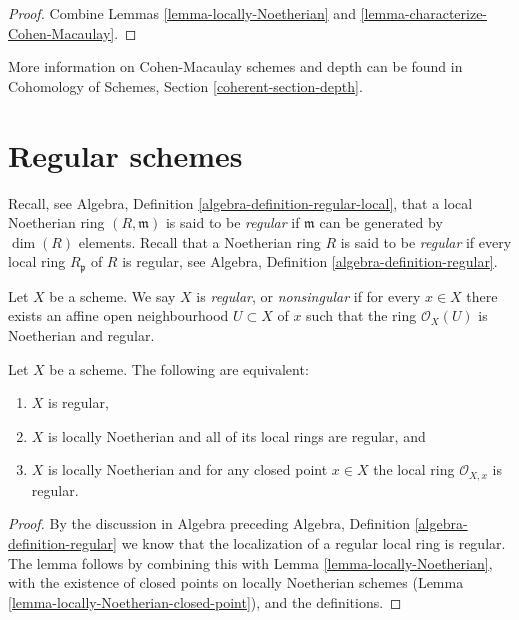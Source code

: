\begin{proof}
Combine Lemmas \ref{lemma-locally-Noetherian}
and \ref{lemma-characterize-Cohen-Macaulay}.
\end{proof}

\noindent
More information on Cohen-Macaulay schemes and depth can be found in
Cohomology of Schemes, Section \ref{coherent-section-depth}.








\section{Regular schemes}
\label{section-regular}

\noindent
Recall, see Algebra, Definition \ref{algebra-definition-regular-local},
that a local Noetherian ring $(R, \mathfrak m)$ is
said to be {\it regular} if $\mathfrak m$ can be generated
by $\dim(R)$ elements.
Recall that a Noetherian ring $R$ is said to be {\it regular} if
every local ring $R_{\mathfrak p}$ of $R$ is regular,
see Algebra, Definition \ref{algebra-definition-regular}.

\begin{definition}
\label{definition-regular}
Let $X$ be a scheme. We say $X$ is {\it regular}, or {\it nonsingular} if
for every $x \in X$ there exists an affine open neighbourhood
$U \subset X$ of $x$ such that the ring $\mathcal{O}_X(U)$ is
Noetherian and regular.
\end{definition}

\begin{lemma}
\label{lemma-characterize-regular}
Let $X$ be a scheme. The following are equivalent:
\begin{enumerate}
\item $X$ is regular,
\item $X$ is locally Noetherian and all of its local rings are regular,
and
\item $X$ is locally Noetherian and for any closed point $x \in X$
the local ring $\mathcal{O}_{X, x}$ is regular.
\end{enumerate}
\end{lemma}

\begin{proof}
By the discussion in Algebra preceding Algebra, Definition
\ref{algebra-definition-regular} we know that the localization of
a regular local ring is regular. The lemma follows
by combining this with Lemma \ref{lemma-locally-Noetherian},
with the existence of closed
points on locally Noetherian schemes
(Lemma \ref{lemma-locally-Noetherian-closed-point}), and
the definitions.
\end{proof}

